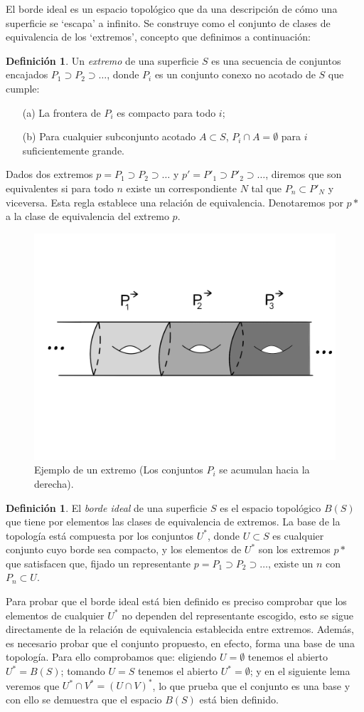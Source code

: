 \documentclass[a4paper,11pt,spanish, twoside, leqno]{tfg-uam}
\theoremstyle{definition}
\newtheorem{defin}[teor]{Definici\'on}
\begin{document}
El borde ideal es un espacio topológico que da una descripción de cómo una superficie se `escapa' a infinito. Se construye como el conjunto de clases de equivalencia de los `extremos', concepto que definimos a continuación:

\begin{defin}
\label{defin:extremo}
Un \textit{extremo} de una superficie $S$ es una secuencia de conjuntos encajados $P_1 \supset P_2 \supset \ldots$, donde $P_i$ es un conjunto conexo no acotado de $S$ que cumple:
\begin{enumerate}
\item[(a)] La frontera de $P_i$ es compacto para todo $i$;
\item[(b)] Para cualquier subconjunto acotado $A \subset S$, $P_i \cap A = \emptyset$ para $i$ suficientemente grande.
\end{enumerate}
\end{defin}
Dados dos extremos $p = P_1 \supset P_2 \supset \ldots$  y  $p' = P'_1 \supset P'_2 \supset \ldots$, diremos que son equivalentes si para todo $n$ existe un correspondiente $N$ tal que $P_n \subset P'_N$ y viceversa.  Esta regla establece una relación de equivalencia. Denotaremos por $p*$ a la clase de equivalencia del extremo $p$.


\begin{figure}[h!]
	\centering
	\includegraphics[width=0.5\linewidth]{imagenes/final.png}
	\caption{Ejemplo de un extremo (Los conjuntos $P_i$ se acumulan hacia la derecha).}
	\label{fig:extremo}
\end{figure}

\begin{defin}
El \textit{borde ideal} de una superficie $S$ es el espacio topológico $B(S)$ que tiene por elementos las clases de equivalencia de extremos. La base de la topología está compuesta por los conjuntos $U^*$, donde $U\subset S$ es cualquier conjunto  cuyo borde sea compacto, y los elementos de $U^*$ son los extremos $p*$ que satisfacen que, fijado un representante $p=P_1 \supset P_2 \supset \ldots $, existe un $n$ con $P_n \subset U$.
\end{defin}
Para probar que el borde ideal está bien definido es preciso comprobar que los elementos de cualquier $U^*$ no dependen del representante escogido, esto se sigue directamente de la relación de equivalencia establecida entre extremos. Además, es necesario probar que el conjunto propuesto, en efecto, forma una base de una topología. Para ello comprobamos que: eligiendo $U=\emptyset$ tenemos el abierto $U^*=B(S)$; tomando $U = S$ tenemos el abierto $U^*=\emptyset$; y en el siguiente lema veremos que $U^* \cap V^* = (U \cap V)^*$, lo que prueba que el conjunto es una base y con ello se demuestra que el espacio $B(S)$ está bien definido.
\end{document}
